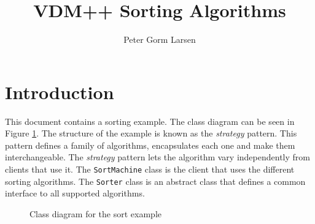 \documentclass{article}
\title{VDM++ Sorting Algorithms}
\author{Peter Gorm Larsen}
\begin{document}
\maketitle

\section{Introduction}

This document contains a sorting example. The class diagram can be
seen in Figure \ref{inh}.  The structure of the example is known as
the \textit{strategy} pattern. This pattern defines a family of
algorithms, encapsulates each one and make them interchangeable. The
\textit{strategy} pattern lets the algorithm vary independently from
clients that use it. The \texttt{SortMachine} class is the client that uses the
different sorting algorithms. The \texttt{Sorter} class is an abstract class
that defines a common interface to all supported algorithms.


\begin{figure}[tbh]
\begin{center}
\mbox{}
\caption{Class diagram for the sort example}\label{inh}
\end{center}
\end{figure}













\newpage
{}
\printindex
\end{document}
